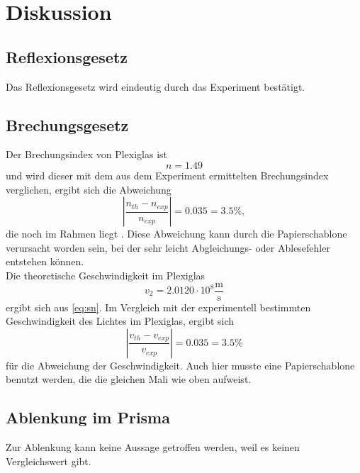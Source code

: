 \section{Diskussion}
\label{sec:Diskussion}

\subsection{Reflexionsgesetz}
Das Reflexionsgesetz wird eindeutig durch das Experiment bestätigt.

\subsection{Brechungsgesetz}
Der Brechungsindex von Plexiglas ist 
\begin{equation*}
  n=1.49
\end{equation*}
und wird dieser mit dem aus dem Experiment ermittelten Brechungsindex verglichen, ergibt sich die Abweichung
\begin{equation*}
  |\frac{n_{th} - n_{exp}}{n_{exp}}|=0.035=3.5\%,
\end{equation*}
die noch im Rahmen liegt \cite{2}. Diese Abweichung kann durch die Papierschablone verursacht worden sein, bei der sehr leicht Abgleichungs- oder Ablesefehler entstehen können.\\
Die theoretische Geschwindigkeit im Plexiglas
\begin{equation*}
  v_2=2.0120\cdot 10^8 \frac{\textrm{m}}{\textrm{s}}
\end{equation*} 
ergibt sich aus \eqref{eq:sn}. Im Vergleich mit der experimentell bestimmten Geschwindigkeit des Lichtes im Plexiglas, ergibt sich 
\begin{equation*}
  |\frac{v_{th} - v_{exp}}{v_{exp}}|=0.035=3.5\%
\end{equation*}
für die Abweichung der Geschwindigkeit. Auch hier musste eine Papierschablone benutzt werden, die die gleichen Mali wie oben aufweist.

\subsection{Ablenkung im Prisma}
Zur Ablenkung kann keine Aussage getroffen werden, weil es keinen Vergleichswert gibt. 

